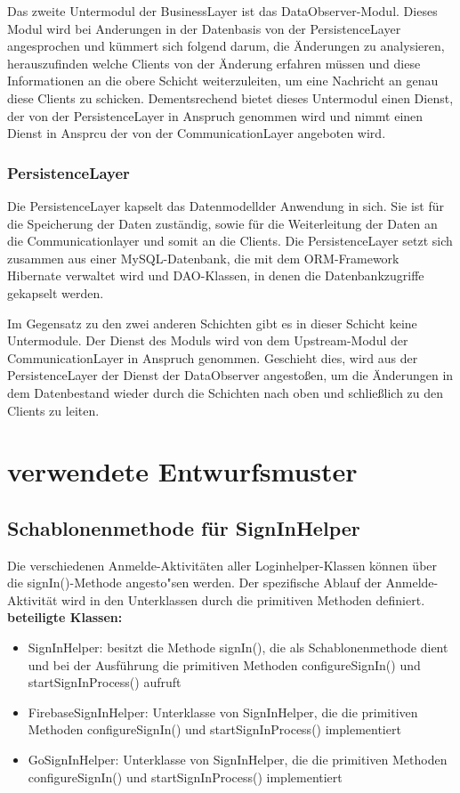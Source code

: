 Das zweite Untermodul der BusinessLayer ist das DataObserver-Modul. Dieses Modul wird bei Anderungen in der Datenbasis von der PersistenceLayer angesprochen und kümmert sich folgend darum, die Änderungen zu analysieren, herauszufinden welche Clients von der Änderung erfahren müssen und diese Informationen an die obere Schicht weiterzuleiten, um eine Nachricht an genau diese Clients zu schicken. Dementsrechend bietet dieses Untermodul einen Dienst, der von der PersistenceLayer in Anspruch genommen wird und nimmt einen Dienst in Ansprcu der von der CommunicationLayer angeboten wird.

\subsubsection{PersistenceLayer}
Die PersistenceLayer kapselt das Datenmodellder Anwendung in sich. Sie ist für die Speicherung der Daten zuständig, sowie für die Weiterleitung der Daten an die Communicationlayer und somit an die Clients. Die PersistenceLayer setzt sich zusammen aus einer MySQL-Datenbank, die mit dem ORM-Framework Hibernate verwaltet wird und DAO-Klassen, in denen die Datenbankzugriffe gekapselt werden.

Im Gegensatz zu den zwei anderen Schichten gibt es in dieser Schicht keine Untermodule. Der Dienst des Moduls wird von dem Upstream-Modul der CommunicationLayer in Anspruch genommen. Geschieht dies, wird aus der PersistenceLayer der Dienst der DataObserver angestoßen, um die Änderungen in dem Datenbestand wieder durch die Schichten nach oben und schließlich zu den Clients zu leiten.

\newpage


\section{verwendete Entwurfsmuster}

\subsection{Schablonenmethode für SignInHelper}
Die verschiedenen Anmelde-Aktivitäten aller Loginhelper-Klassen können über die signIn()-Methode angesto"sen werden. Der spezifische Ablauf der Anmelde-Aktivität wird in den Unterklassen durch die primitiven Methoden definiert. \\

\textbf{beteiligte Klassen:}
\begin{itemize}
	\item SignInHelper: besitzt die Methode signIn(), die als Schablonenmethode dient und bei der Ausführung die primitiven Methoden configureSignIn() und startSignInProcess() aufruft
	\item FirebaseSignInHelper: Unterklasse von SignInHelper, die die primitiven Methoden configureSignIn() und startSignInProcess() implementiert
	\item GoSignInHelper: Unterklasse von SignInHelper, die die primitiven Methoden configureSignIn() und startSignInProcess() implementiert
\end{itemize}

